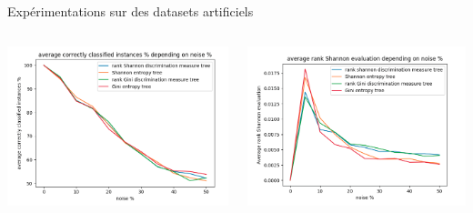 \documentclass[usenames,dvipsnames]{beamer}
\begin{document}
\begin{frame}{Expérimentations sur des datasets artificiels}
\begin{columns}
\begin{column}{0.45\textwidth}
            \centering
            \includegraphics[width=\textwidth]{acc_3.png}
        \end{column}
        \begin{column}{0.45\textwidth}
            \centering
            \includegraphics[width=\textwidth]{shannon_eval_3.png}
        \end{column}
    \end{columns}
\end{frame}
\end{document}

